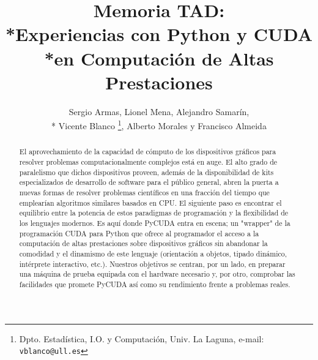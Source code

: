 \documentclass[twoside]{article}
\begin{document}

\title{Memoria TAD:\\*Experiencias con Python y CUDA\\*en Computación de Altas Prestaciones}

\author{Sergio Armas, %
     Lionel Mena, %
     Alejandro Samarín,\\*%
     Vicente Blanco%
     \thanks{Dpto. Estadística, I.O. y Computación, Univ. La Laguna, e-mail: {\tt vblanco@ull.es}}, %
     Alberto Morales y %
     Francisco Almeida
}

\maketitle
\markboth{}{}
\pagestyle{empty} 
\thispagestyle{empty} %

\begin{abstract}
El aprovechamiento de la capacidad de cómputo de los dispositivos gráficos para resolver problemas computacionalmente complejos está en auge. El alto grado de paralelismo que dichos dispositivos proveen, además de la disponibilidad de kits especializados de desarrollo de software para el público general, abren la puerta a nuevas formas de resolver problemas científicos en una fracción del tiempo que emplearían algoritmos similares basados en CPU. El siguiente paso es encontrar el equilibrio entre la potencia de estos paradigmas de programación y la flexibilidad de los lenguajes modernos. Es aquí donde PyCUDA \cite{DBLP:journals/corr/abs-0911-3456} entra en escena; un "wrapper" de la programación CUDA para Python que ofrece al programador el acceso a la computación de altas prestaciones sobre dispositivos gráficos sin abandonar la comodidad y el dinamismo de este lenguaje (orientación a objetos, tipado dinámico, intérprete interactivo, etc.). Nuestros objetivos se centran, por un lado, en preparar una máquina de prueba equipada con el hardware necesario y, por otro, comprobar las facilidades que promete PyCUDA así como su rendimiento frente a problemas reales.
\end{abstract}

\end{document}
